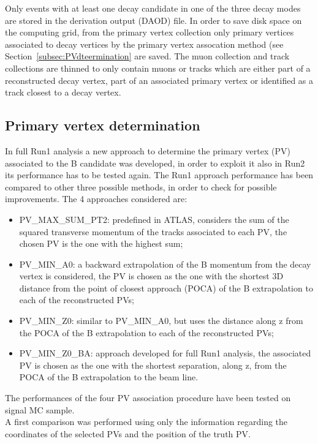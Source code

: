 Only events with at least one decay candidate in one of the three
decay modes are stored in the derivation output (DAOD) file.  In order to
save disk space on the computing grid, from the
primary vertex collection only primary vertices associated to decay
vertices by the primary vertex assocation method (see
Section~\ref{subsec:PVdteermination} are saved. 
The muon collection and track collections are thinned to only contain
muons or tracks which are either part of a reconstructed decay vertex,
part of an associated primary vertex or identified as a track closest
to a decay vertex.
 


\subsection{Primary vertex determination}
\label{subsec:PVdetermination}
In full Run1 analysis a new approach to determine the primary vertex (PV) associated to the B candidate was developed, in order to exploit it also in Run2 its performance has to be tested again.
The Run1 approach performance has been compared to other three possible methods, in order to check for possible improvements. The 4 approaches considered are:
\begin{itemize}
\item PV\_MAX\_SUM\_PT2: predefined in ATLAS, considers the sum of the squared transverse momentum of the tracks associated to each PV, the chosen PV is the one with the highest sum;
\item PV\_MIN\_A0: a backward extrapolation of the B momentum from the decay vertex is considered, the PV is chosen as the one with the shortest 3D distance from the point of closest approach (POCA) of the B extrapolation to each of the reconstructed PVs;
\item PV\_MIN\_Z0: similar to PV\_MIN\_A0, but uses the distance along z from the POCA of the B extrapolation to each of the reconstructed PVs;
\item PV\_MIN\_Z0\_BA: approach developed for full Run1 analysis, the associated PV is chosen as the one with the shortest separation, along z, from the POCA of the B extrapolation to the beam line.
\end{itemize}
The performances of the four PV association procedure have been tested on signal MC sample.\\
A first comparison was performed using only the information regarding the coordinates of the selected PVs and the position of the truth PV.\\
